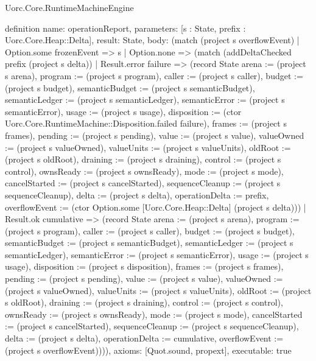 \begin{lexlean}{Uorc.Core.RuntimeMachineEngine}
\begin{semanticmodule}
definition{
  name: operationReport,
  parameters: [s : State, prefix : Uorc.Core.Heap::Delta],
  result: State,
  body: (match (project s overflowEvent)
    | Option.some frozenEvent => s
    | Option.none => (match (addDeltaChecked prefix (project s delta))
      | Result.error failure => (record State {arena := (project s arena), program := (project s program), caller := (project s caller), budget := (project s budget), semanticBudget := (project s semanticBudget), semanticLedger := (project s semanticLedger), semanticError := (project s semanticError), usage := (project s usage), disposition := (ctor Uorc.Core.RuntimeMachine::Disposition.failed failure), frames := (project s frames), pending := (project s pending), value := (project s value), valueOwned := (project s valueOwned), valueUnits := (project s valueUnits), oldRoot := (project s oldRoot), draining := (project s draining), control := (project s control), ownsReady := (project s ownsReady), mode := (project s mode), cancelStarted := (project s cancelStarted), sequenceCleanup := (project s sequenceCleanup), delta := (project s delta), operationDelta := prefix, overflowEvent := (ctor Option.some [Uorc.Core.Heap::Delta] (project s delta))})
      | Result.ok cumulative => (record State {arena := (project s arena), program := (project s program), caller := (project s caller), budget := (project s budget), semanticBudget := (project s semanticBudget), semanticLedger := (project s semanticLedger), semanticError := (project s semanticError), usage := (project s usage), disposition := (project s disposition), frames := (project s frames), pending := (project s pending), value := (project s value), valueOwned := (project s valueOwned), valueUnits := (project s valueUnits), oldRoot := (project s oldRoot), draining := (project s draining), control := (project s control), ownsReady := (project s ownsReady), mode := (project s mode), cancelStarted := (project s cancelStarted), sequenceCleanup := (project s sequenceCleanup), delta := (project s delta), operationDelta := cumulative, overflowEvent := (project s overflowEvent)}))),
  axioms: [Quot.sound, propext],
  executable: true
}


\end{semanticmodule}
\end{lexlean}
